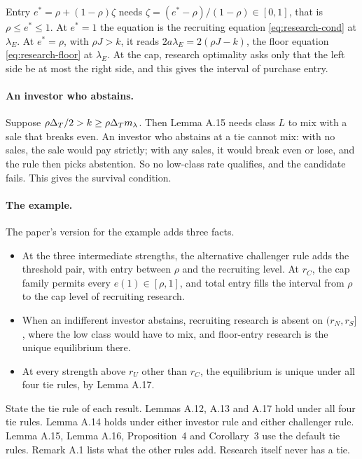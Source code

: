 Entry \(e^*=\rho+(1-\rho)\zeta\) needs \(\zeta=(e^*-\rho)/(1-\rho)\in[0,1]\), that is \(\rho\le e^*\le1\). At \(e^*=1\) the
equation is the recruiting equation \eqref{eq:research-cond} at \(\lambda_E\). At \(e^*=\rho\), with \(\rho J>k\), it reads
\(2a\lambda_E=2(\rho J-k)\), the floor equation \eqref{eq:research-floor} at \(\lambda_E\). At the cap, research optimality
asks only that the left side be at most the right side, and this gives the interval of purchase entry.

\paragraph{An investor who abstains.} Suppose \(\rho\Delta_T/2>k\ge\rho\Delta_T m_\lambda\). Then Lemma A.15 needs class \(L\) to
mix with a sale that breaks even. An investor who abstains at a tie cannot mix: with no sales, the sale would pay
strictly; with any sales, it would break even or lose, and the rule then picks abstention. So no low-class rate
qualifies, and the candidate fails. This gives the survival condition.

\paragraph{The example.} The paper's version for the example adds three facts.
\begin{itemize}
\item At the three intermediate strengths, the alternative challenger rule adds the threshold pair, with entry between
\(\rho\) and the recruiting level. At \(r_C\), the cap family permits every \(e(1)\in[\rho,1]\), and total entry fills
the interval from \(\rho\) to the cap level of recruiting research.
\item When an indifferent investor abstains, recruiting research is absent on \((r_N,r_S]\), where the low class would
have to mix, and floor-entry research is the unique equilibrium there.
\item At every strength above \(r_U\) other than \(r_C\), the equilibrium is unique under all four tie rules, by
Lemma A.17.
\end{itemize}

\begin{watchout}
State the tie rule of each result. Lemmas A.12, A.13 and A.17 hold under all four tie rules. Lemma A.14 holds under
either investor rule and either challenger rule. Lemma A.15, Lemma A.16, Proposition~4 and Corollary~3 use the
default tie rules. Remark A.1 lists what the other rules add. Research itself never has a tie.
\end{watchout}

